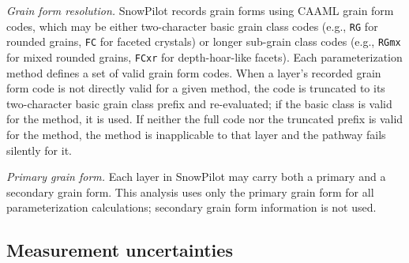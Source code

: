 \documentclass[hess, manuscript]{copernicus}
\begin{document}
\textit{Grain form resolution.} SnowPilot records grain forms using CAAML grain form codes, which may be either two-character basic grain class codes (e.g., \texttt{RG} for rounded grains, \texttt{FC} for faceted crystals) or longer sub-grain class codes (e.g., \texttt{RGmx} for mixed rounded grains, \texttt{FCxr} for depth-hoar-like facets). Each parameterization method defines a set of valid grain form codes. When a layer's recorded grain form code is not directly valid for a given method, the code is truncated to its two-character basic grain class prefix and re-evaluated; if the basic class is valid for the method, it is used. If neither the full code nor the truncated prefix is valid for the method, the method is inapplicable to that layer and the pathway fails silently for it.

\textit{Primary grain form.} Each layer in SnowPilot may carry both a primary and a secondary grain form. This analysis uses only the primary grain form for all parameterization calculations; secondary grain form information is not used.


\subsection{Measurement uncertainties}
\label{sec:uncertainties}





\end{document}
